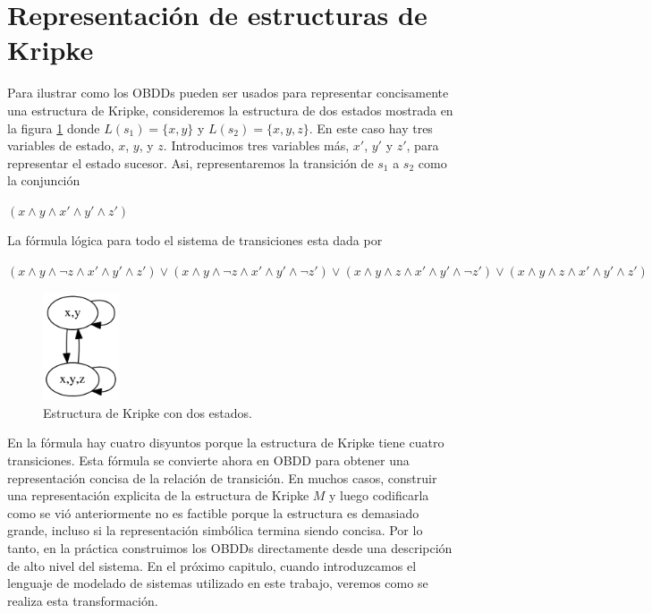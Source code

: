 \section{Representación de estructuras de Kripke}

Para ilustrar como los OBDDs pueden ser usados para representar concisamente una estructura de Kripke, consideremos la estructura de dos estados mostrada en la figura \ref{fig:kripke2} donde $L(s_{1}) = \{x,y\}$ y $L(s_{2}) = \{x,y,z\}$. En este caso hay tres variables de estado, $x$, $y$, y $z$. Introducimos tres variables más, $x'$, $y'$ y $z'$, para representar el estado sucesor. Asi, representaremos la transición de $s_{1}$ a $s_{2}$ como la conjunción

$(x \land y \land x' \land y' \land z')$

La fórmula lógica para todo el sistema de transiciones esta dada por

$(x \land y \land \neg z \land x' \land y' \land z') \lor (x \land y \land \neg z \land x' \land y' \land \neg z') \lor (x \land y \land z \land x' \land y' \land \neg z') \lor (x \land y \land z \land x' \land y' \land z')$ 
\begin{figure}[H]
  \centering
  \includegraphics[width=0.2\textwidth]{Figures/kripke2.png}
  \caption{Estructura de Kripke con dos estados.}
  \label{fig:kripke2}
\end{figure}

En la fórmula hay cuatro disyuntos porque la estructura de Kripke tiene cuatro transiciones. Esta fórmula se convierte ahora en OBDD para obtener una representación concisa de la relación de transición.
En muchos casos, construir una representación explicita de la estructura de Kripke $M$ y luego codificarla como se vió anteriormente no es factible porque la estructura es demasiado grande, incluso si la representación simbólica termina siendo concisa. Por lo tanto, en la práctica construimos los OBDDs directamente desde una descripción de alto nivel del sistema. En el próximo capitulo, cuando introduzcamos el lenguaje de modelado de sistemas utilizado en este trabajo, veremos como se realiza esta transformación.

